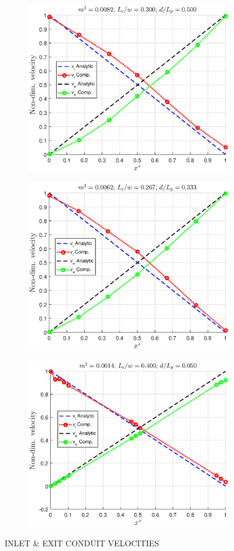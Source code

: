 \documentclass[twocolumn,10pt,cleanfoot]{ihmtc}
\begin{document}
\begin{figure}
\centering
   \begin{subfigure}[b]{0.55\textwidth}
   \includegraphics[height=0.55\linewidth,width=0.90\linewidth]{velvalid_a.eps}
    \caption{} 
   \label{velvalid_a} 
\end{subfigure}
%
   \begin{subfigure}[b]{0.55\textwidth}
   \includegraphics[height=0.55\linewidth,width=0.90\linewidth]{velvalid_b.eps}
   \caption{}
   \label{velvalid_b} 
\end{subfigure}
%
%
   \begin{subfigure}[b]{0.55\textwidth}
   \includegraphics[height=0.55\linewidth,width=0.90\linewidth]{velvalid_c.eps}
   \caption{}
   \label{velvalid_c} 
\end{subfigure}
%
\caption{INLET \& EXIT CONDUIT VELOCITIES}
\vspace{-3em}
\end{figure}
%
%
\end{document}
